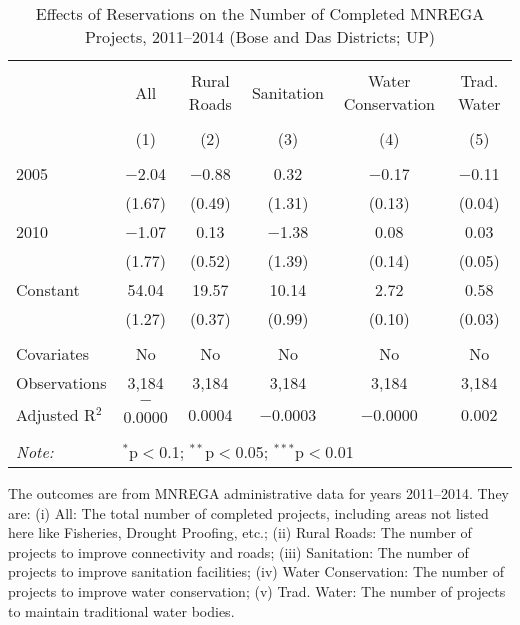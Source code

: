 \begin{table}[!htbp]
\centering
\begin{threeparttable}

  \caption{Effects of Reservations on the Number of Completed MNREGA Projects, 2011--2014 (Bose and Das Districts; UP)} 
  \label{mnrega_up_bd_districts_05_10} 
\scriptsize 
\begin{tabular}{@{\extracolsep{0pt}}lccccc} 
\\[-1.8ex]\hline 
\hline \\[-1.8ex] 
 & All & Rural Roads & Sanitation & Water Conservation & Trad. Water \\ 
\\[-1.8ex] & (1) & (2) & (3) & (4) & (5)\\ 
\hline \\[-1.8ex] 
 2005 & $-$2.04 & $-$0.88 & 0.32 & $-$0.17 & $-$0.11 \\ 
  & (1.67) & (0.49) & (1.31) & (0.13) & (0.04) \\ 
  2010 & $-$1.07 & 0.13 & $-$1.38 & 0.08 & 0.03 \\ 
  & (1.77) & (0.52) & (1.39) & (0.14) & (0.05) \\ 
  Constant & 54.04 & 19.57 & 10.14 & 2.72 & 0.58 \\ 
  & (1.27) & (0.37) & (0.99) & (0.10) & (0.03) \\ 
 \hline \\[-1.8ex] 
Covariates & No & No & No & No & No \\ 
Observations & 3,184 & 3,184 & 3,184 & 3,184 & 3,184 \\ 
Adjusted R$^{2}$ & $-$0.0000 & 0.0004 & $-$0.0003 & $-$0.0000 & 0.002 \\ 
\hline 
\hline \\[-1.8ex] 
\textit{Note:}  & \multicolumn{5}{l}{$^{*}$p$<$0.1; $^{**}$p$<$0.05; $^{***}$p$<$0.01} \\ 
\end{tabular} 
\begin{tablenotes}[flushleft]
\scriptsize
\item The outcomes are from MNREGA administrative data for years 2011--2014. They are: 
(i) All: The total number of completed projects, including areas not listed here like Fisheries, Drought Proofing, etc.;
(ii) Rural Roads: The number of projects to improve connectivity and roads;
(iii) Sanitation: The number of projects to improve sanitation facilities;
(iv) Water Conservation: The number of projects to improve water conservation;
(v) Trad. Water: The number of projects to maintain traditional water bodies.
\end{tablenotes}
\end{threeparttable}
\end{table}
